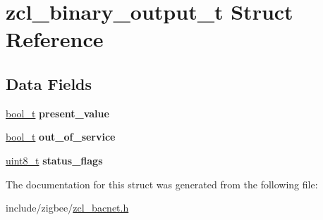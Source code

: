 \hypertarget{structzcl__binary__output__t}{\section{zcl\-\_\-binary\-\_\-output\-\_\-t Struct Reference}
\label{structzcl__binary__output__t}
}
\subsection*{Data Fields}
\begin{DoxyCompactItemize}
\item 
\hypertarget{structzcl__binary__output__t_af4e8127dc0a55a10699a9061d39c69de}{\hyperlink{group__hal_ga04dd5074964518403bf944f2b240a5f8}{bool\-\_\-t} {\bfseries present\-\_\-value}}\label{structzcl__binary__output__t_af4e8127dc0a55a10699a9061d39c69de}

\item 
\hypertarget{structzcl__binary__output__t_a799c8381b2a5db57c647919204ccbcac}{\hyperlink{group__hal_ga04dd5074964518403bf944f2b240a5f8}{bool\-\_\-t} {\bfseries out\-\_\-of\-\_\-service}}\label{structzcl__binary__output__t_a799c8381b2a5db57c647919204ccbcac}

\item 
\hypertarget{structzcl__binary__output__t_a10648237c443d265057a85b7d770d4ce}{\hyperlink{group__hal_gae1affc9ca37cfb624959c866a73f83c2}{uint8\-\_\-t} {\bfseries status\-\_\-flags}}\label{structzcl__binary__output__t_a10648237c443d265057a85b7d770d4ce}

\end{DoxyCompactItemize}


The documentation for this struct was generated from the following file\-:\begin{DoxyCompactItemize}
\item 
include/zigbee/\hyperlink{zcl__bacnet_8h}{zcl\-\_\-bacnet.\-h}\end{DoxyCompactItemize}
